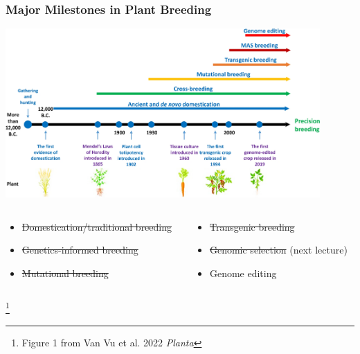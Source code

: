 \documentclass[xcolor=dvipsnames]{beamer}
\newcommand\blfootnote[1]{%
	\begingroup
	\renewcommand\thefootnote{}\footnote{#1}%
	\addtocounter{footnote}{-1}%
	\endgroup
}
\begin{document}
\begin{frame}
	\frametitle{Major Milestones in Plant Breeding}
	\centering	\includegraphics[keepaspectratio, width  = 0.9\textwidth]{img/timeLine}
	
	
	\begin{columns}
		\begin{column}{0.5\textwidth}
			\begin{itemize}
				\item[\textbf{1}] \st{Domestication/traditional breeding}
				\item[\textbf{2}] \st{Genetics-informed breeding}
				\item[\textbf{3}] \st{Mutational breeding}
			\end{itemize}
		\end{column}
		\begin{column}{0.5\textwidth}
			\begin{itemize}
				\item[\textbf{4}] \st{Transgenic breeding}
				\item[\textbf{5}] \st{Genomic selection} (next lecture)
				\item[\textbf{6}] Genome editing
			\end{itemize}
		\end{column}
	\end{columns}
	
	\blfootnote{Figure 1 from Van Vu et al. 2022 \textit{Planta}}
	
	
	
\end{frame}
\end{document}
